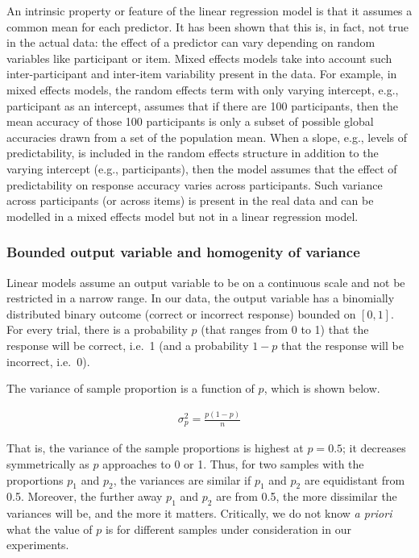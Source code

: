 \documentclass[a4paper, nobind]{templates/ociamthesis}
\begin{document}
An intrinsic property or feature of the linear regression model is that it assumes a common mean for each predictor.
It has been shown that this is, in fact, not true in the actual data:
the effect of a predictor can vary depending on random variables like participant or item.
Mixed effects models take into account such inter-participant and inter-item variability present in the data.
For example, in mixed effects models,
the random effects term with only varying intercept, e.g., participant as an intercept, assumes that if there are 100 participants, then the mean accuracy of those 100 participants is only a subset of possible global accuracies drawn from a set of the population mean.
When a slope, e.g., levels of predictability, is included in the random effects structure in addition to the varying intercept (e.g., participants), then the model assumes that the effect of predictability on response accuracy varies across participants.
Such variance across participants (or across items) is present in the real data
and can be modelled in a mixed effects model but not in a linear regression model.

\hypertarget{bounded-output-variable-and-homogenity-of-variance}{%
\subsubsection{Bounded output variable and homogenity of variance}\label{bounded-output-variable-and-homogenity-of-variance}}

Linear models assume an output variable to be on a continuous scale and not be restricted in a narrow range.
In our data, the output variable has a binomially distributed binary outcome (correct or incorrect response) bounded on \([0,1]\).
For every trial, there is a probability \(p\) (that ranges from 0 to 1) that the response will be correct, i.e.~1 (and a probability \(1-p\) that the response will be incorrect, i.e.~0).

The variance of sample proportion is a function of \(p\), which is shown below.

\begin{align} \label{eq:variance}
\sigma^2_p = \frac{p(1-p)}{n}
\end{align}

That is, the variance of the sample proportions is highest at \(p=0.5\);
it decreases symmetrically as \(p\) approaches to 0 or 1.
Thus, for two samples with the proportions \(p_1\) and \(p_2\), the variances are similar if \(p_1\) and \(p_2\) are equidistant from 0.5.
Moreover, the further away \(p_1\) and \(p_2\) are from 0.5, the more dissimilar the variances will be, and the more it matters.
Critically, we do not know \emph{a priori} what the value of \(p\) is for different samples under consideration in our experiments.
\end{document}
